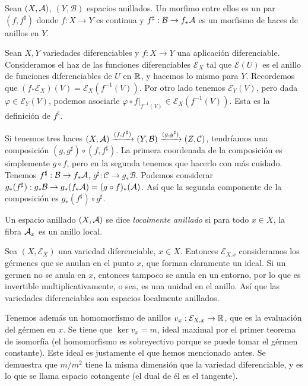 \documentclass[GA.tex]{subfiles}
\begin{document}
 \begin{defi}
 Sean $(X,\mathcal{A})$, $(Y,\mathcal{B})$ espacios anillados. Un morfimo entre ellos es un par $(f, f^{\sharp})$ donde $f:X\to Y$ es continua y $f^{\sharp}:\mathcal{B}\to f_*\mathcal{A}$ es un morfismo de haces de anillos en $Y$. 
 
\end{defi} 


\begin{ej}
Sean $X,Y$ variedades diferenciables y $f:X\to Y$ una aplicación diferenciable. Consideramos el haz de las funciones diferenciables $\mathcal{E}_X$ tal que $\mathcal{E}(U)$ es el anillo de funciones diferenciables de $U$ en $\mathbb{R}$, y hacemos lo mismo para $Y$. Recordemos que $(f_*\mathcal{E}_X)(V)=\mathcal{E}_X(f^{-1}(V))$. Por otro lado tenemos $\mathcal{E}_Y(V)$, pero dada $\varphi\in \mathcal{E}_Y(V)$, podemos asociarle $\varphi\circ f|_{f^{-1}(V)}\in\mathcal{E}_X(f^{-1}(V))$. Esta es la definición de $f^{\sharp}$. 
\end{ej}

Si tenemos tres haces $(X,\mathcal{A})\xrightarrow{(f,f^{\sharp})}(Y,\mathcal{B})\xrightarrow{(g,g^{\sharp})}(Z,\mathcal{C})$, tendríamos una composición $(g,g^{\sharp})\circ(f, f^{\sharp})$. La primera coordenada de la composición es simplemente $g\circ f$, pero en la segunda tenemos que hacerlo con más cuidado. Tenemos $f^{\sharp}:\mathcal{B}\to f_*\mathcal{A}$, $g^{\sharp}:\mathcal{C}\to g_*\mathcal{B}$. Podemos considerar $g_*(f^{\sharp}):g_*\mathcal{B}\to g_*(f_*\mathcal{A})=(g\circ f)_*(\mathcal{A})$. Así que la segunda componente de la composición es $g_*(f^\sharp)\circ g^{\sharp}$. 



\begin{defi}
Un espacio anillado $(X,\mathcal{A})$ se dice \emph{localmente anillado} si para todo $x\in X$, la fibra $\mathcal{A}_x$ es un anillo local.
\end{defi}


\begin{ej}
Sea $(X,\mathcal{E}_X)$ una variedad diferenciable, $x\in X$. Entonces $\mathcal{E}_{X.x}$ consideramos los gérmenes que se anulan en el punto $x$, que forman claramente un ideal. Si un germen no se anula en $x$, entonces tampoco se anula en un entorno, por lo que es invertible multiplicativamente, o sea, es una unidad en el anillo. Así que las variedades diferenciables son espacios localmente anillados.

Tenemos además un homomorfismo de anillos $v_x:\mathcal{E}_{X,x}\to \mathbb{R}$, que es la evaluación del gérmen en $x$. Se tiene que $\ker v_x=m$, ideal maximal por el primer teorema de isomorfía (el homomorfismo es sobreyectivo porque se puede tomar el gérmen constante). Este ideal es justamente el que hemos mencionado antes. Se demuestra que $m/m^2$ tiene la misma dimensión que la variedad diferenciable, y es lo que se llama espacio cotangente (el dual de él es el tangente). 
\end{ej}
\end{document}
